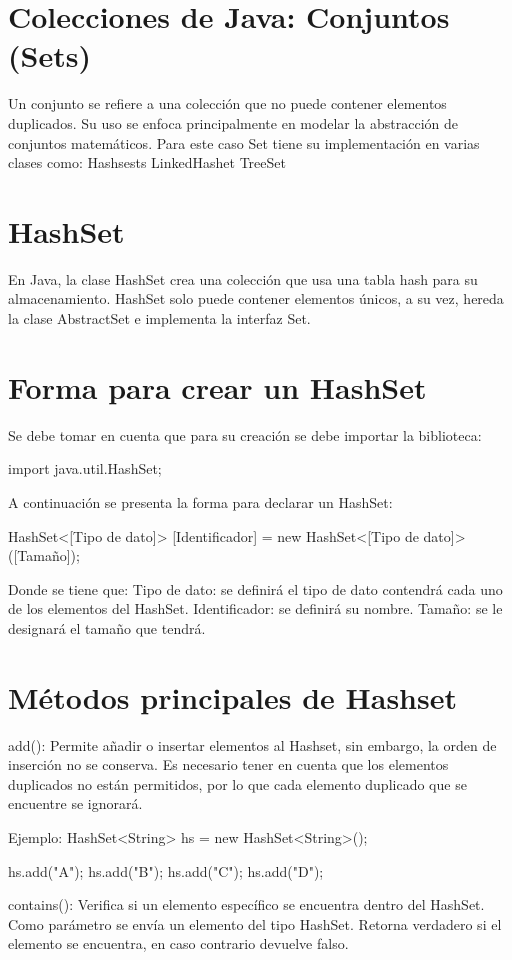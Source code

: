 \documentclass[12pt, letterpaper]{article} %
\begin{document}
\section{Colecciones de Java: Conjuntos (Sets)}
Un conjunto se refiere a una colección que no puede contener elementos duplicados. Su uso se enfoca principalmente en modelar la abstracción de conjuntos matemáticos. Para este caso Set tiene su implementación en varias clases como:
Hashsests
LinkedHashet
TreeSet

\section*{HashSet}
En Java, la clase HashSet crea una colección que usa una tabla hash para su almacenamiento. HashSet solo puede contener elementos únicos, a su vez, hereda la clase AbstractSet e implementa la interfaz Set.

\section*{Forma para crear un HashSet}
Se debe tomar en cuenta que para su creación se debe importar la biblioteca:

import java.util.HashSet;

A continuación se presenta la forma para declarar un HashSet:

HashSet<[Tipo de dato]> [Identificador] = new HashSet<[Tipo de dato]>([Tamaño]);

Donde se tiene que:
Tipo de dato: se definirá el tipo de dato contendrá cada uno de los elementos del HashSet.
Identificador: se definirá su nombre.
Tamaño: se le designará el tamaño que tendrá.

\section*{Métodos principales de Hashset}
add():
Permite añadir o insertar elementos al Hashset, sin embargo, la orden de inserción no se conserva. Es necesario tener en cuenta que los elementos duplicados no están permitidos, por lo que cada elemento duplicado que se encuentre se ignorará. 

Ejemplo:
HashSet<String> hs = new HashSet<String>();

hs.add("A");
hs.add("B");
hs.add("C");
hs.add("D");


contains():
Verifica si un elemento específico se encuentra dentro del HashSet. Como parámetro se envía un elemento del tipo HashSet. Retorna  verdadero si el elemento se encuentra, en caso contrario devuelve falso.
\end{document}
